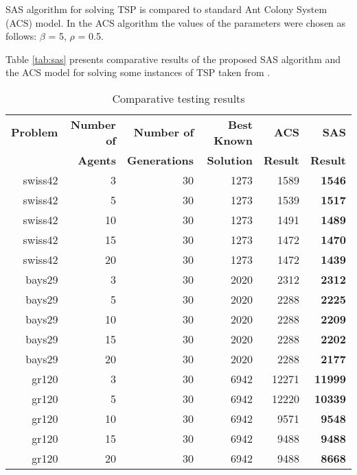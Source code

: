 SAS algorithm for solving TSP is compared to standard Ant Colony
System (ACS) model. In the ACS algorithm the values of the
parameters were chosen as follows: $\beta$ = 5, $\rho$ = 0.5. 

    Table \ref{tab:sas} presents comparative results of the proposed SAS algorithm and the ACS model for solving some  instances of TSP taken from \cite{tsplib}.


\begin{table}[h]
\label{tab:sas}

  \begin{tabular}{|r|r|r|r|r|r|}
\hline \textbf{Problem} & \textbf{Number of} & \textbf{Number of} & \textbf{Best Known} & \textbf{ACS} & \textbf{SAS}\\
 & \textbf{Agents} & \textbf{Generations} & \textbf{Solution} & \textbf{Result}  & \textbf{Result}\\
\hline
swiss42 & 3 &  30 & 1273 &   1589 &   \textbf{1546}\\
\hline
swiss42 & 5 &  30 & 1273 &   1539 &   \textbf{1517}\\
\hline
swiss42 & 10 &  30 &  1273 &    1491 &    \textbf{1489}\\
\hline
swiss42 & 15 &  30 &  1273 &    1472 &    \textbf{1470}\\
\hline
swiss42 & 20 &  30 &  1273 &    1472  &   \textbf{1439}\\
\hline
bays29 &  3 &   30 &  2020 &    2312 &    \textbf{2312}\\
\hline
bays29 &   5 &    30  &  2020  &    2288  &    \textbf{2225}\\
\hline
bays29 &   10  &  30  &  2020  &    2288  &    \textbf{2209}\\
\hline
bays29  &  15 &   30 &   2020  &    2288  &    \textbf{2202}\\
\hline
bays29 &   20 &   30 &   2020 &     2288  &    \textbf{2177}\\
\hline
gr120  &    3  &    30 &    6942 &      12271 &     \textbf{11999}\\
\hline
gr120  &   5  &   30  &  6942  &    12220  &   \textbf{10339}\\
\hline
gr120  &   10  &  30  &  6942  &    9571  &    \textbf{9548}\\
\hline
gr120  &   15  &  30  &  6942  &    9488  &    \textbf{9488}\\
\hline
gr120  &   20  &  30  &  6942  &    9488  &    \textbf{8668}\\
\hline
\end{tabular}

 \caption{Comparative testing results}
 \label{table:testResults}
 \end{table}

